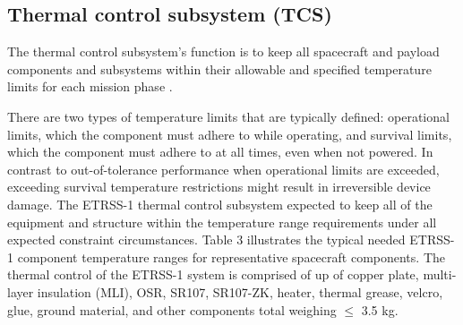 \documentclass[final,5p,times,twocolumn]{elsarticle}
\begin{document}
\subsection{Thermal control subsystem (TCS)}
The thermal control subsystem's function is to keep all spacecraft and payload components and subsystems within their allowable and specified temperature limits for each mission phase \cite{rotteveel2005thermal}.
\begin{table}[ht]
	\small
	\caption{Typical thermal requirements of ETRSS-1 spacecraft components} %
	\centering %
	\label{table:nonlin} %
\end{table}
 There are two types of temperature limits \cite{larson1992space} that are typically defined: operational limits, which the component must adhere to while operating, and survival limits, which the component must adhere to at all times, even when not powered. In contrast to out-of-tolerance performance when operational limits are exceeded, exceeding survival temperature restrictions might result in irreversible device damage.  The ETRSS-1 thermal control subsystem expected to keep all of the equipment and structure within the temperature range requirements under all expected constraint circumstances.  Table 3 illustrates the typical needed ETRSS-1 component temperature ranges for representative spacecraft components. The thermal control of the ETRSS-1 system is comprised of up of copper plate, multi-layer insulation (MLI), OSR, SR107, SR107-ZK, heater, thermal grease, velcro, glue, ground material, and other components total weighing $\leq$ 3.5 kg.
\end{document}
